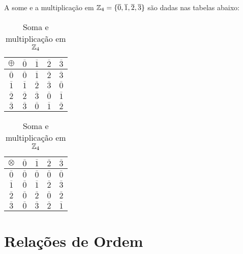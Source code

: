 \begin{exemplo}
	A some e a multiplica{\c c}{\~a}o em $\mathbb{Z}_4 = \{\overline{0},\overline{1},\overline{2},\overline{3}\}$
	são dadas nas tabelas abaixo:
		\begin{table}[!htb]
		  \caption{Soma e multiplicação em $\mathbb{Z}_4$}
		  \begin{minipage}{.5\linewidth}
		    \centering
		 	\begin{tabular}{|c|c|c|c|c|} 
			    \hline
			    $\oplus$ & $\overline{0}$ & $\overline{1}$ & $\overline{2}$ & $\overline{3}$\T\\
			    \hline
			    $\overline{0}$ & $\overline{0}$ & $\overline{1}$ & $\overline{2}$ & $\overline{3}$\T\\
			    \hline
			    $\overline{1}$ & $\overline{1}$ & $\overline{2}$ & $\overline{3}$ & $\overline{0}$\T\\
			    \hline
			    $\overline{2}$ & $\overline{2}$ & $\overline{3}$ & $\overline{0}$ & $\overline{1}$\T\\
			    \hline
			    $\overline{3}$ & $\overline{3}$ & $\overline{0}$ & $\overline{1}$ & $\overline{2}$\T\\
			    \hline
			\end{tabular}
		  \end{minipage}
		  \begin{minipage}{.5\linewidth}
		  \centering
		    \begin{tabular}{|c|c|c|c|c|} 
		      \hline
		      $\otimes$ & $\overline{0}$ & $\overline{1}$ & $\overline{2}$ & $\overline{3}$\T\\
		      \hline
		      $\overline{0}$ & $\overline{0}$ & $\overline{0}$ & $\overline{0}$ & $\overline{0}$\T\\
		      \hline
		      $\overline{1}$ & $\overline{0}$ & $\overline{1}$ & $\overline{2}$ & $\overline{3}$\T\\
		      \hline
		      $\overline{2}$ & $\overline{0}$ & $\overline{2}$ & $\overline{0}$ & $\overline{2}$\T\\
		      \hline
		      $\overline{3}$ & $\overline{0}$ & $\overline{3}$ & $\overline{2}$ & $\overline{1}$\T\\
		      \hline
			\end{tabular}
		\end{minipage}
	\end{table}
\end{exemplo}

\section{Relações de Ordem} %
\label{sec:relacoes_de_ordem}

